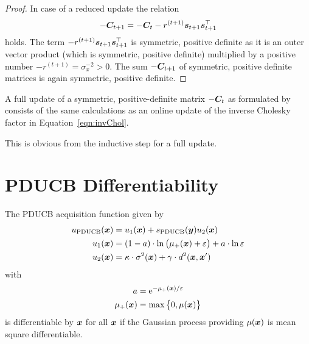 \begin{proof}
    In case of a reduced update the relation
    \begin{equation*}
        -\bm{C}_{t+1} = -\bm{C}_t - r^{(t+1)} \bm{s}_{t+1} \bm{s}_{t+1}^{\top}
    \end{equation*}
    holds. The term $- r^{(t+1)} \bm{s}_{t+1} \bm{s}_{t+1}^{\top}$ is symmetric, 
    positive definite as it is an outer vector product (which is symmetric, 
    positive definite) multiplied by a positive number $-r^{(t+1)} 
    = \sigma_x^{-2} > 0$. The sum $-\bm{C}_{t+1}$ of symmetric, positive 
    definite matrices is again symmetric, positive definite.
\end{proof}

\begin{corollary}
    A full update of a symmetric, positive-definite matrix $-\bm{C}_t$ as 
    formulated by \textcite[equation~2.9]{Csato:2002fp} consists of the same 
    calculations as an online update of the inverse Cholesky factor in 
    Equation~\ref{eqn:invChol}.
\end{corollary}
This is obvious from the inductive step for a full update.

\chapter{PDUCB Differentiability}\label{sec:pducb-diff}
\begin{theorem}
    The PDUCB acquisition function given by
    \begin{align*}
    u\ped{PDUCB}(\vc x) &= u_1(\vc x) + s\ped{PDUCB}(\vc y) u_2(\vc x) \\
    u_1(\vc x) &= \del{1 - a} \cdot \ln\del{\mu_+(\vc x) + \varepsilon} 
    + a \cdot \ln \varepsilon \\
    u_2(\vc x) &= \kappa \cdot \sigma^2(\vc x) + \gamma \cdot d^2(\vc x, \vc x')
    \end{align*}
    with
    \begin{align*}
    a &= \e^{-\mu_+(\vc x) / \varepsilon} \\
    \mu_+(\vc x) &= \max\cbr{0, \mu(\vc x)}
    \end{align*}
    is differentiable by $\bm{x}$ for all $\bm{x}$ if the Gaussian process 
    providing $\mu(\bm{x})$ is mean square differentiable.
\end{theorem}

